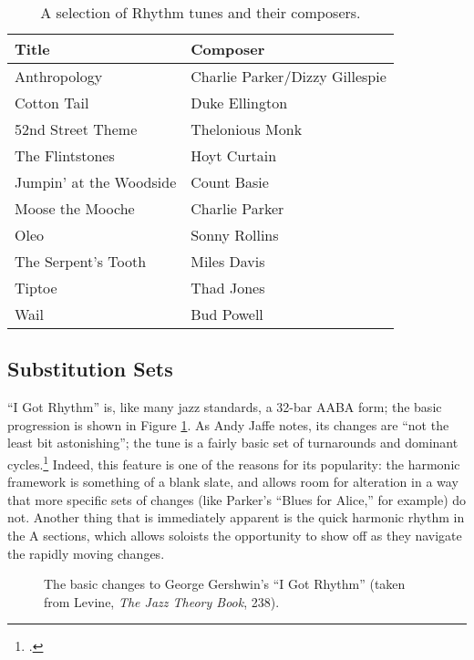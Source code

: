 \begin{table}[tbp]
  \setlength{\tabcolsep}{12pt}
  \centering
  \begin{tabular}{ll}
    Title  & Composer \\
    \hline
    \rule[1em]{0ex}{1ex}%
    Anthropology        & Charlie Parker/Dizzy Gillespie \\
    Cotton Tail         & Duke Ellington \\
    52nd Street Theme   & Thelonious Monk \\
    The Flintstones     & Hoyt Curtain \\
    Jumpin' at the Woodside & Count Basie \\
    Moose the Mooche    & Charlie Parker \\
    Oleo                & Sonny Rollins \\
    The Serpent's Tooth & Miles Davis \\
    Tiptoe              & Thad Jones \\
    Wail                & Bud Powell
  \end{tabular}
  \caption{A selection of Rhythm tunes and their composers.}
  \label{rcg:rhythm-tunes}
\end{table}

\subsection{Substitution Sets}
\label{subsec:substitution-sets}

``I Got Rhythm'' is, like many jazz standards, a 32-bar AABA form; the basic
progression is shown in Figure \ref{rcg:rhythm-basic}. As Andy Jaffe
notes, its changes are ``not the least bit astonishing''; the tune is a fairly
basic set of turnarounds and dominant cycles.\footcite[149]{jaffe:1996}
Indeed, this feature is one of the reasons for its popularity: the harmonic
framework is something of a blank slate, and allows room for alteration in a
way that more specific sets of changes (like Parker's ``Blues for Alice,'' for
example) do not. Another thing that is immediately apparent is the quick
harmonic rhythm in the A sections, which allows soloists the opportunity to
show off as they navigate the rapidly moving changes.

\begin{figure}[tbp]
  \caption[The basic changes to George Gershwin's ``I Got Rhythm.'']{%
    The basic changes to George Gershwin's ``I Got Rhythm'' (taken from
    Levine, \emph{The Jazz Theory Book}, 238).}\nocite{levine:1995}
  \label{rcg:rhythm-basic}
\end{figure}

